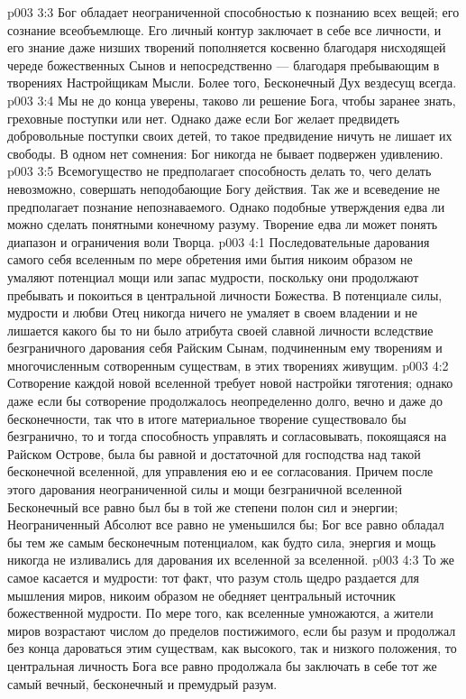 \vs p003 3:3 Бог обладает неограниченной способностью к познанию всех вещей; его сознание всеобъемлюще. Его личный контур заключает в себе все личности, и его знание даже низших творений пополняется косвенно благодаря нисходящей череде божественных Сынов и непосредственно --- благодаря пребывающим в творениях Настройщикам Мысли. Более того, Бесконечный Дух вездесущ всегда.
\vs p003 3:4 Мы не до конца уверены, таково ли решение Бога, чтобы заранее знать, греховные поступки или нет. Однако даже если Бог желает предвидеть добровольные поступки своих детей, то такое предвидение ничуть не лишает их свободы. В одном нет сомнения: Бог никогда не бывает подвержен удивлению.
\vs p003 3:5 \pc Всемогущество не предполагает способность делать то, чего делать невозможно, совершать неподобающие Богу действия. Так же и всеведение не предполагает познание непознаваемого. Однако подобные утверждения едва ли можно сделать понятными конечному разуму. Творение едва ли может понять диапазон и ограничения воли Творца.
\vs p003 4:1 Последовательные дарования самого себя вселенным по мере обретения ими бытия никоим образом не умаляют потенциал мощи или запас мудрости, поскольку они продолжают пребывать и покоиться в центральной личности Божества. В потенциале силы, мудрости и любви Отец никогда ничего не умаляет в своем владении и не лишается какого бы то ни было атрибута своей славной личности вследствие безграничного дарования себя Райским Сынам, подчиненным ему творениям и многочисленным сотворенным существам, в этих творениях живущим.
\vs p003 4:2 Сотворение каждой новой вселенной требует новой настройки тяготения; однако даже если бы сотворение продолжалось неопределенно долго, вечно и даже до бесконечности, так что в итоге материальное творение существовало бы безгранично, то и тогда способность управлять и согласовывать, покоящаяся на Райском Острове, была бы равной и достаточной для господства над такой бесконечной вселенной, для управления ею и ее согласования. Причем после этого дарования неограниченной силы и мощи безграничной вселенной Бесконечный все равно был бы в той же степени полон сил и энергии; Неограниченный Абсолют все равно не уменьшился бы; Бог все равно обладал бы тем же самым бесконечным потенциалом, как будто сила, энергия и мощь никогда не изливались для дарования их вселенной за вселенной.
\vs p003 4:3 То же самое касается и мудрости: тот факт, что разум столь щедро раздается для мышления миров, никоим образом не обедняет центральный источник божественной мудрости. По мере того, как вселенные умножаются, а жители миров возрастают числом до пределов постижимого, если бы разум и продолжал без конца дароваться этим существам, как высокого, так и низкого положения, то центральная личность Бога все равно продолжала бы заключать в себе тот же самый вечный, бесконечный и премудрый разум.
